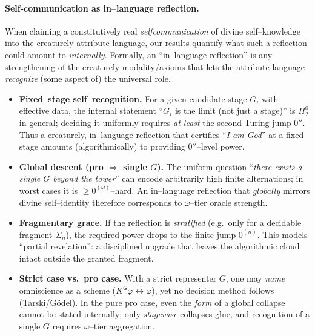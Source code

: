 \documentclass[11pt]{article}
\theoremstyle{upright}
\begin{document}
\paragraph{Self-communication as in–language reflection.}
When claiming a constitutively real \emph{self\-communication} of divine self–knowledge into the creaturely attribute language, our results quantify what such a reflection could amount to \emph{internally}. Formally, an “in–language reflection” is any strengthening of the creaturely modality/axioms that lets the attribute language \emph{recognize} (some aspect of) the universal role.

\begin{infobox}[title={Calibration of in–language reflection}]
\begin{itemize}[leftmargin=1.7em]
\item \textbf{Fixed–stage self–recognition.} For a given candidate stage $G_i$ with effective data, the internal statement “$G_i$ is the limit (not just a stage)” is $\Pi^0_2$ in general; deciding it uniformly requires \emph{at least} the second Turing jump $0''$. Thus a creaturely, in–language reflection that certifies “\emph{I am God}” at a fixed stage amounts (algorithmically) to providing $0''$–level power.

\item \textbf{Global descent (pro $\Rightarrow$ single $G$).} The uniform question “\emph{there exists a single $G$ beyond the tower}” can encode arbitrarily high finite alternations; in worst cases it is $\ge 0^{(\omega)}$–hard. An in–language reflection that \emph{globally} mirrors divine self–identity therefore corresponds to $\omega$–tier oracle strength.

\item \textbf{Fragmentary grace.} If the reflection is \emph{stratified} (e.g.\ only for a decidable fragment $\Sigma_n$), the required power drops to the finite jump $0^{(n)}$. This models “partial revelation”: a disciplined upgrade that leaves the algorithmic cloud intact outside the granted fragment.

\item \textbf{Strict case vs.\ pro case.} With a strict representer $G$, one may \emph{name} omniscience as a scheme ($K^{\mathsf G}\varphi\!\leftrightarrow\!\varphi$), yet no decision method follows (Tarski/Gödel). In the pure pro case, even the \emph{form} of a global collapse cannot be stated internally; only \emph{stagewise} collapses glue, and recognition of a single $G$ requires $\omega$–tier aggregation.
\end{itemize}
\end{infobox}
\end{document}
